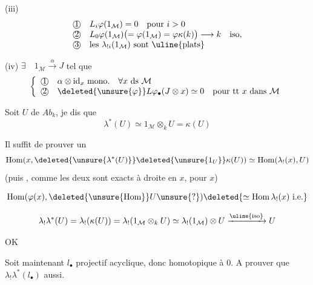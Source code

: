 (iii) 
\[
\begin{array}{ll}
\text{\textcircled{1}}&L_i\varphi(1_{\mathcal M})=0\quad\text{pour }i>0\\
\text{\textcircled{2}}&L_0\varphi(1_{\mathcal M})\bigl(=\varphi(1_{\mathcal M})=\varphi\kappa(k)\bigr)\longrightarrow k\quad\text{iso},\\
\text{\textcircled{3}}&\text{les }\lambda_{!i}(1_{\mathcal M})\text{ sont \uline{plats}}
\end{array}
\]

(iv) $\exists\quad1_{\mathcal M}\xrightarrow\alpha J$ tel que
\[
\left\{\begin{array}{ll}
\text{\textcircled{1}}&\alpha\otimes\mathrm{id}_x\text{ mono.}\quad\forall x\text{ ds }\mathcal M\\
\text{\textcircled{2}}&\deleted{\unsure{\varphi}}L\varphi_\bullet(J\otimes x)\simeq0\quad\text{pour tt }x\text{ dans }\mathcal M
\end{array}\right.
\]

\deleted{\unsure{$\lambda$}} Soit $U$ de $Ab_k$, je dis que
\[
\lambda^*(U)\simeq1_{\mathcal M}\otimes_kU=\kappa(U)
\]

Il suffit de prouver un 
\[
\operatorname{Hom}(x,\deleted{\unsure{\lambda^*(U)}}\deleted{\unsure{1_U}}\kappa(U))
\simeq\operatorname{Hom}(\lambda_!(x),U)
\]
 (puis , comme les deux sont exacts à droite en $x$,  pour  $x$)

\[
\operatorname{Hom}(\varphi(x),\deleted{\unsure{\mathrm{Hom}}}U\unsure{?})
\deleted{\simeq\operatorname{Hom}\lambda_!(x)\text{ i.e.}}
\]

\[
\lambda_!\lambda^*(U)=\lambda_!(\kappa(U))=\lambda_!(1_{\mathcal M}\otimes_kU)
\simeq\lambda_!(1_{\mathcal M})\otimes U\xrightarrow{\uline{\text{iso}}}U
\]

OK

Soit maintenant $l_\bullet$ projectif  acyclique,
donc homotopique à $0$. A prouver que $\lambda_!\lambda^*(l_\bullet)$ aussi.

